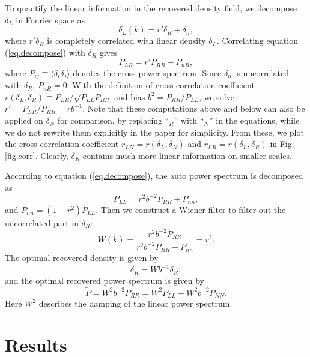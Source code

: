 \documentclass[aps,prd,twocolumn,superscriptaddress,amsfont,amssymb,amsmath,nofootinbib,showpacs,balancelastpage]{revtex4-1}
\begin{document}
To quantify the linear information in the recovered density field, we decompose $\delta_L$ in Fourier space as
\begin{equation}\label{eq.decompose}
    \delta_L(k)=r'\delta_R+\delta_n,
\end{equation}
where $r'\delta_R$ is completely correlated with linear density $\delta_L$. Correlating equation (\ref{eq.decompose}) with $\delta_R$ gives
\begin{equation}
    P_{LR}=r'P_{RR}+P_{nR},
\end{equation}
where $P_{ij}\equiv\langle\delta_i\delta_j\rangle$ denotes the cross power 
spectrum. Since $\delta_n$ is uncorrelated with $\delta_R$, $P_{nR}=0$. With the 
definition of cross correlation coefficient $r(\delta_L,\delta_R)\equiv P_{LR}/\sqrt{P_{LL}P_{RR}}$ 
and bias $b^2=P_{RR}/P_{LL}$, we solve $r'=P_{LR}/P_{RR}=rb^{-1}$.
Note that these computations above and below can also be applied on $\delta_N$ for
comparison, by replacing ``$_R$'' with ``$_N$'' in the equations,
while we do not rewrite them explicitly
in the paper for simplicity. From these, we plot the cross 
correlation coefficient $r_{LN}=r(\delta_L,\delta_N)$ and
$r_{LR}=r(\delta_L,\delta_R)$ in Fig.\ref{fig.corr}. Clearly, $
\delta_R$ contains much more linear information on smaller scales.

According to equation (\ref{eq.decompose}), the auto power spectrum is decomposed as
\begin{equation}\label{eq.power}
    P_{LL}=r^2b^{-2}P_{RR}+P_{nn},
\end{equation}
and $P_{nn}=(1-r^2)P_{LL}$. Then we construct a Wiener filter to filter out the uncorrelated part in $\delta_R$:
\begin{equation}
    W(k)=\frac{r^2b^{-2}P_{RR}}{r^2b^{-2}P_{RR}+P_{nn}}=r^2.
\end{equation}
The optimal recovered density is given by
\begin{equation}
    \tilde\delta_R=Wb^{-1}\delta_R,
\end{equation}
and the optimal recovered power spectrum is given by
\begin{equation}\label{eq.opt}
    \tilde P=W^2b^{-2}P_{RR}=W^2P_{LL}+W^2b^{-2}P_{NN}.
\end{equation}
Here $W^2$ describes the damping of the linear power spectrum.

\section{Results}\label{sec.results}
\end{document}
